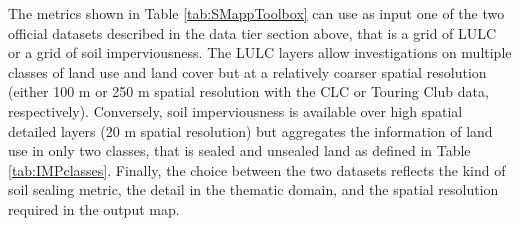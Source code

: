 \documentclass[APA,LATO1COL,doublespace]{WileyNJD-v2}
\begin{document}
The metrics shown in Table \ref{tab:SMappToolbox} can use as input one of the two official datasets described in the data tier section above, that is a grid of LULC or a grid of soil imperviousness. 
The LULC layers allow investigations on multiple classes of land use and land cover but at a relatively coarser spatial resolution (either 100 m or 250 m spatial resolution with the CLC or Touring Club data, respectively).
Conversely, soil imperviousness is available over high spatial detailed layers (20 m spatial resolution) but aggregates the information of land use in only two classes, that is sealed and unsealed land as defined in Table \ref{tab:IMPclasses}. 
Finally, the choice between the two datasets reflects the kind of soil sealing metric, the detail in the thematic domain, and the spatial resolution required in the output map.
\end{document}
